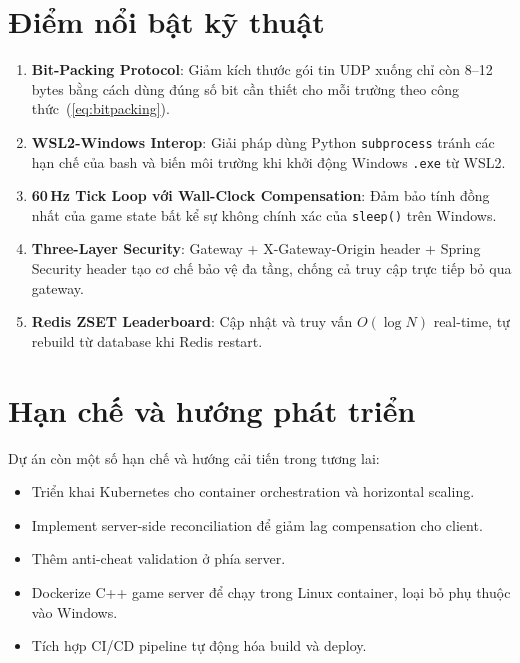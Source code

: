\documentclass[12pt,a4paper]{report}
\begin{document}
\section{Điểm nổi bật kỹ thuật}

\begin{enumerate}
  \item \textbf{Bit-Packing Protocol}: Giảm kích thước gói tin UDP xuống chỉ còn 8--12 bytes bằng cách dùng đúng số bit cần thiết cho mỗi trường theo công thức~(\ref{eq:bitpacking}).
  \item \textbf{WSL2-Windows Interop}: Giải pháp dùng Python \texttt{subprocess} tránh các hạn chế của bash và biến môi trường khi khởi động Windows \texttt{.exe} từ WSL2.
  \item \textbf{60\,Hz Tick Loop với Wall-Clock Compensation}: Đảm bảo tính đồng nhất của game state bất kể sự không chính xác của \texttt{sleep()} trên Windows.
  \item \textbf{Three-Layer Security}: Gateway + X-Gateway-Origin header + Spring Security header tạo cơ chế bảo vệ đa tầng, chống cả truy cập trực tiếp bỏ qua gateway.
  \item \textbf{Redis ZSET Leaderboard}: Cập nhật và truy vấn $O(\log N)$ real-time, tự rebuild từ database khi Redis restart.
\end{enumerate}

\section{Hạn chế và hướng phát triển}

Dự án còn một số hạn chế và hướng cải tiến trong tương lai:

\begin{itemize}
  \item Triển khai Kubernetes cho container orchestration và horizontal scaling.
  \item Implement server-side reconciliation để giảm lag compensation cho client.
  \item Thêm anti-cheat validation ở phía server.
  \item Dockerize C++ game server để chạy trong Linux container, loại bỏ phụ thuộc vào Windows.
  \item Tích hợp CI/CD pipeline tự động hóa build và deploy.
\end{itemize}

\end{document}
